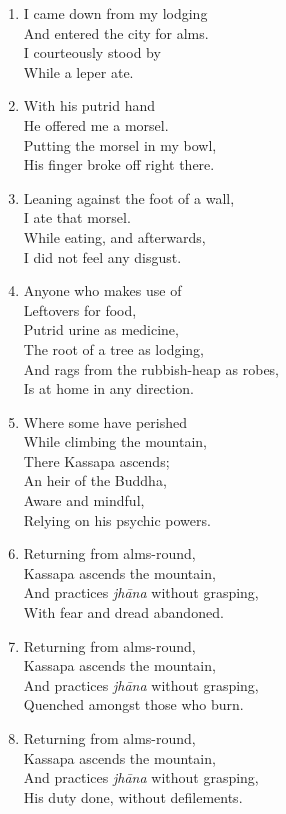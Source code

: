 \documentclass[10pt, openany]{book}
\begin{document}
\begin{enumerate}
\item I came down from my lodging\\
And entered the city for alms.\\
I courteously stood by\\
While a leper ate.

\item With his putrid hand\\
He offered me a morsel.\\
Putting the morsel in my bowl,\\
His finger broke off right there.

\item Leaning against the foot of a wall,\\
I ate that morsel.\\
While eating, and afterwards,\\
I did not feel any disgust.

\item Anyone who makes use of\\
Leftovers for food,\\
Putrid urine as medicine,\\
The root of a tree as lodging,\\
And rags from the rubbish-heap as robes,\\
Is at home in any direction.

\item Where some have perished\\
While climbing the mountain,\\
There Kassapa ascends;\\
An heir of the Buddha,\\
Aware and mindful,\\
Relying on his psychic powers.

\item Returning from alms-round,\\
Kassapa ascends the mountain,\\
And practices \emph{jhāna} without grasping,\\
With fear and dread abandoned.

\item Returning from alms-round,\\
Kassapa ascends the mountain,\\
And practices \emph{jhāna} without grasping,\\
Quenched amongst those who burn.

\item Returning from alms-round,\\
Kassapa ascends the mountain,\\
And practices \emph{jhāna} without grasping,\\
His duty done, without defilements.


\end{enumerate}
\end{document}
